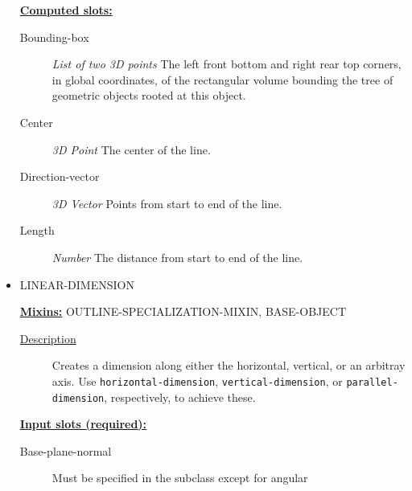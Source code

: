 \documentclass [11pt]{book}
\begin{document}
\begin{itemize}
\textbf{
\underline{Computed slots:}}

\begin{description}

\item [Bounding-box]
\emph{List of two 3D points} The left front bottom and right rear top corners, in global coordinates,
of the rectangular volume bounding the tree of geometric objects rooted at this object.


\item [Center]
\emph{3D Point} The center of the line.


\item [Direction-vector]
\emph{3D Vector} Points from start to end of the line.


\item [Length]
\emph{Number} The distance from start to end of the line.


\end{description}







\item {}LINEAR-DIMENSION


\textbf{
\underline{Mixins:}} OUTLINE-SPECIALIZATION-MIXIN, BASE-OBJECT





\begin{description}

\item [
\underline{Description}]


Creates a dimension along either the horizontal, vertical, or an arbitray axis. Use
\texttt{horizontal-dimension}, \texttt{vertical-dimension}, or \texttt{parallel-dimension}, respectively, to achieve these.



\end{description}








\textbf{
\underline{Input slots (required):}}

\begin{description}

\item [Base-plane-normal]
Must be specified in the subclass except for angular



\end{description}
\end{itemize}
\end{document}

